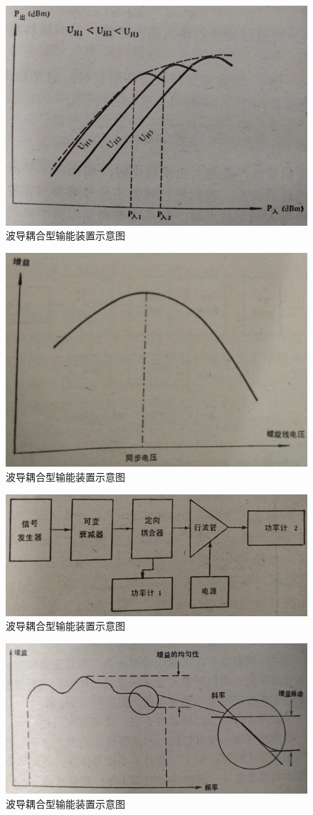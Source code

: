 \begin{figure}[phtb]
	\centering
	\includegraphics[width=0.75\linewidth]{figure/ch11-2}
	\caption{ 波导耦合型输能装置示意图}
	\label{ch11-2}
\end{figure}
\begin{figure}[phtb]
	\centering
	\includegraphics[width=0.75\linewidth]{figure/ch11-3}
	\caption{ 波导耦合型输能装置示意图}
	\label{ch11-3}
\end{figure}
\begin{figure}[phtb]
	\centering
	\includegraphics[width=0.75\linewidth]{figure/ch11-4}
	\caption{ 波导耦合型输能装置示意图}
	\label{ch11-4}
\end{figure}
\begin{figure}[phtb]
	\centering
	\includegraphics[width=0.75\linewidth]{figure/ch11-5}
	\caption{ 波导耦合型输能装置示意图}
	\label{ch11-5}
\end{figure}

